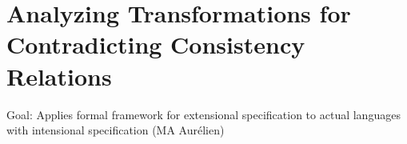 


\section{Analyzing Transformations for Contradicting Consistency Relations }
Goal: Applies formal framework for extensional specification to actual languages with intensional specification (MA Aurélien)


